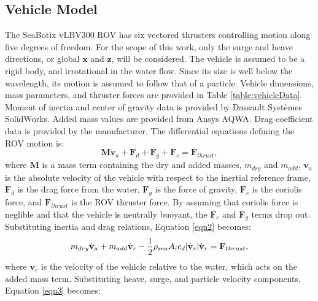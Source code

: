 \documentclass[letterpaper, 10pt, conference]{IEEEtran}
\DeclarePairedDelimiter\abs{\lvert}{\rvert}%
\renewcommand{\vec}[1]{\mathbf{#1}}
\begin{document}
\subsection{Vehicle Model}

The SeaBotix vLBV300 ROV has six vectored thrusters controlling motion along five degrees of freedom. For the scope of this work, only the surge and heave directions, or global $\vec{x}$ and $\vec{z}$, will be considered. The vehicle is assumed to be a rigid body, and irrotational in the water flow. Since its size is well below the wavelength, its motion is assumed to follow that of a particle. Vehicle dimensions, mass parameters, and thruster forces are provided in Table \ref{table:vehicleData}. Moment of inertia and center of gravity data is provided by Dassault Systèmes SolidWorks. Added mass values are provided from Ansys AQWA. Drag coefficient data is provided by the manufacturer. The differential equations defining the ROV motion is: 
\begin{equation}
\vec{M}\dot{\vec{v}}_a + \vec{F}_d + \vec{F}_g + \vec{F}_c = \vec{F}_{thrust},
\label{eqn2}
\end{equation}
where $\vec{M}$ is a mass term containing the dry and added masses, $m_{dry}$ and $m_{add}$, $\vec{v}_a$ is the absolute velocity of the vehicle with respect to the inertial reference frame, $\vec{F}_d$ is the drag force from the water, $\vec{F}_g$ is the force of gravity, $\vec{F}_c$ is the coriolis force, and $\vec{F}_{thrust}$ is the ROV thruster force. By assuming that coriolis force is neglible and that the vehicle is neutrally buoyant, the $\vec{F}_c$ and $\vec{F}_g$ terms drop out. Substituting inertia and drag relations, Equation \ref{eqn2} becomes: 
\begin{equation}
m_{dry} \dot{\vec{v}}_a + m_{add} \dot{\vec{v}}_r  - \frac{1}{2} \rho_{sea} A_i c_d \abs{\dot{\vec{v}}_r} \dot{\vec{v}}_r = \vec{F}_{thrust},
\label{eqn3}
\end{equation}
where $\vec{v}_r$ is the velocity of the vehicle relative to the water, which acts on the added mass term. Substituting heave, surge, and particle velocity components, Equation \ref{eqn3} becomes:
\end{document}
